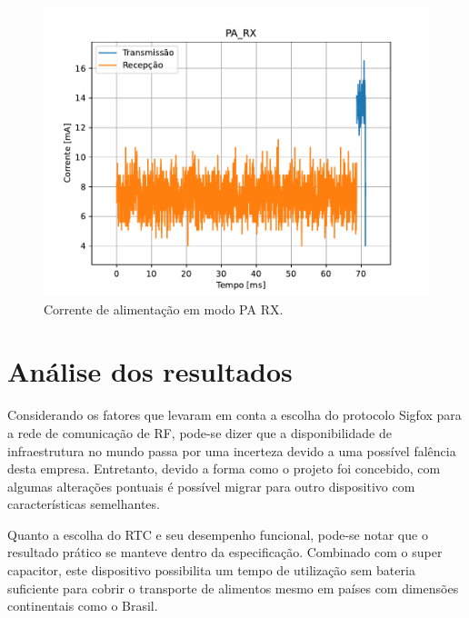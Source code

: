 \begin{figure}[h!]
  \caption{Corrente de alimentação em modo PA RX.}
  \begin{center}
      \includegraphics[scale=0.8]{scripts/PA_RX.pdf}
  \end{center}
  \label{fig:PA_RX}
\end{figure}



\section{Análise dos resultados}
Considerando os fatores que levaram em conta a escolha do protocolo Sigfox para a rede de comunicação de RF, pode-se dizer que a disponibilidade de infraestrutura no mundo passa por uma incerteza devido a uma possível falência desta empresa. Entretanto, devido a forma como o projeto foi concebido, com algumas alterações pontuais é possível migrar para outro dispositivo com características semelhantes.

Quanto a escolha do RTC e seu desempenho funcional, pode-se notar que o resultado prático se manteve dentro da especificação. Combinado com o super capacitor, este dispositivo possibilita um tempo de utilização sem bateria suficiente para cobrir o transporte de alimentos mesmo em países com dimensões continentais como o Brasil.

